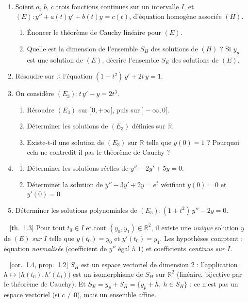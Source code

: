 \documentclass[a4paper,11pt]{article}
\newif\ifprof
\newcommand{\R}{\mathbb{R}}\newcommand{\C}{\mathbb{C}}\newcommand{\K}{\mathbb{K}}
\newcommand{\corrige}{\clearpage\noindent{\sffamily\bfseries\Large\color{Ocre}Corrigé}\par\nobreak
  \noindent{\color{Ocre}\rule{\linewidth}{0.8pt}}\par}
\newcommand{\q}[1]{\par\needspace{3\baselineskip}\smallskip{\sffamily\bfseries\color{Bleu}#1}\ }
\newcommand{\prop}[1]{{\sffamily\footnotesize\color{Gris}[#1]}}
\begin{document}
\begin{enumerate}
\item Soient $a$, $b$, $c$ trois fonctions continues sur un intervalle $I$, et
      $(E)\colon y''+a(t)y'+b(t)y=c(t)$, d'équation homogène associée $(H)$.
  \begin{enumerate}
  \item Énoncer le théorème de Cauchy linéaire pour $(E)$.
  \item Quelle est la dimension de l'ensemble $S_H$ des solutions de $(H)$ ? Si $y_p$ est une solution de $(E)$, décrire
        l'ensemble $S_E$ des solutions de $(E)$.
  \end{enumerate}
\item Résoudre sur $\R$ l'équation $(1+t^2)\,y'+2t\,y=1$.
\item On considère $(E_3)\colon t\,y'-y=2t^3$.
  \begin{enumerate}
  \item Résoudre $(E_3)$ sur $]0,+\infty[$, puis sur $]-\infty,0[$.
  \item Déterminer les solutions de $(E_3)$ définies sur $\R$.
  \item Existe-t-il une solution de $(E_3)$ sur $\R$ telle que $y(0)=1$ ? Pourquoi cela ne contredit-il pas le théorème de
        Cauchy ?
  \end{enumerate}
\item
  \begin{enumerate}
  \item Déterminer les solutions réelles de $y''-2y'+5y=0$.
  \item Déterminer la solution de $y''-3y'+2y=e^{t}$ vérifiant $y(0)=0$ et $y'(0)=0$.
  \end{enumerate}
\item Déterminer les solutions polynomiales de $(E_5)\colon(1+t^2)\,y''-2y=0$.
\end{enumerate}

\ifprof
\corrige
\q{1.a)} \prop{th.~1.3} Pour tout $t_0\in I$ et tout $(y_0,y_1)\in\R^2$, il existe une \emph{unique} solution $y$ de $(E)$
\emph{sur $I$} telle que $y(t_0)=y_0$ et $y'(t_0)=y_1$. Les hypothèses comptent : équation \emph{normalisée} (coefficient
de $y''$ égal à $1$) et coefficients \emph{continus sur $I$}.

\q{1.b)} \prop{cor.~1.4, prop.~1.2} $S_H$ est un espace vectoriel de dimension $2$ : l'application $h\mapsto\big(h(t_0),h'(t_0)\big)$
est un isomorphisme de $S_H$ sur $\R^2$ (linéaire, bijective par le théorème de Cauchy). Et $S_E=y_p+S_H=\{y_p+h,\ h\in S_H\}$ :
ce n'est pas un espace vectoriel (si $c\neq0$), mais un ensemble affine.
\end{document}
